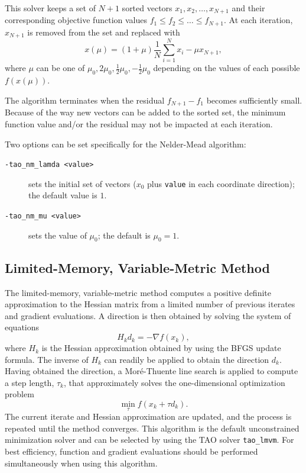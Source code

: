 \documentclass[]{book}
\begin{document}
This solver keeps a set of $N+1$ sorted vectors ${x_1,x_2,\ldots,x_{N+1}}$ and their corresponding 
objective function values $f_1 \leq f_2 \leq \ldots \leq f_{N+1}$.  At each iteration, $x_{N+1}$ is removed from
the set and replaced with 
\[
x(\mu) = (1+\mu) \frac{1}{N} \sum_{i=1}^N x_i - \mu x_{N+1},
\]
where $\mu$ can be one of
${\mu_0,2\mu_0,\frac{1}{2}\mu_0,-\frac{1}{2}\mu_0}$ depending on the
values of 
each possible $f(x(\mu))$.

The algorithm terminates when the residual  $f_{N+1} - f_1$ becomes sufficiently small.  Because of 
the way new vectors can be added to the sorted set, 
the minimum function value and/or the residual may not be impacted at each iteration.

Two options can be set specifically for the Nelder-Mead algorithm:
\begin{description}
\item[\tt -tao\_nm\_lamda <value>] sets the initial set of vectors ($x_0$ plus 
{\tt value} in each coordinate direction); the default value is $1$.  
\item[\tt -tao\_nm\_mu <value>] sets the value of $\mu_0$; the default 
is $\mu_0=1$.
\end{description}

\subsection{Limited-Memory, Variable-Metric Method}%

The limited-memory, variable-metric method computes a positive definite
approximation to the Hessian matrix from a limited number of previous
iterates and gradient evaluations.  A direction is then obtained by
solving the system of equations
\[
H_k d_k = -\nabla f(x_k),
\]
where $H_k$ is the Hessian approximation obtained by using the BFGS update 
formula.  The inverse of $H_k$ can readily be applied to obtain the 
direction $d_k$.  Having obtained the direction, a Mor\'{e}-Thuente 
line search is applied to compute a step length, $\tau_k$, that 
approximately solves the one-dimensional optimization problem
\[
\min_\tau f(x_k + \tau d_k).
\]
The current iterate and Hessian approximation are updated, and the process
is repeated until the method converges.  This algorithm is the default 
unconstrained minimization solver and can be selected by using the 
TAO solver {\tt tao\_lmvm}.  For best efficiency, function and gradient 
evaluations should be performed simultaneously when using this algorithm.
\end{document}
